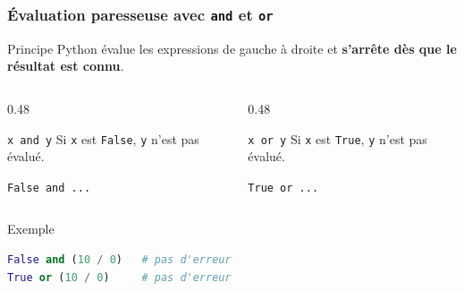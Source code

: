 \documentclass[10pt]{beamer}
\begin{document}
\begin{frame}[containsverbatim]
	\frametitle{Évaluation paresseuse avec \texttt{and} et \texttt{or}}

	\begin{block}{Principe}
		Python évalue les expressions de gauche à droite et
		\textbf{s'arrête dès que le résultat est connu}.
	\end{block}
	
	\vspace{0.2cm}
	
	\begin{columns}[T]
		\begin{column}{0.48\textwidth}
			\begin{alertblock}{\texttt{x and y}}
				Si \texttt{x} est \texttt{False},
				\texttt{y} n'est pas évalué.
				
				\vspace{0.1cm}
				
				\centering
				\texttt{False and ...}
			\end{alertblock}
		\end{column}
		
		\begin{column}{0.48\textwidth}
			\begin{alertblock}{\texttt{x or y}}
				Si \texttt{x} est \texttt{True},
				\texttt{y} n'est pas évalué.
				
				\vspace{0.1cm}
				
				\centering
				\texttt{True or ...}
			\end{alertblock}
		\end{column}
	\end{columns}
	
	\vspace{0.15cm}
	
\begin{exampleblock}{Exemple}
\begin{lstlisting}[language=Python]
False and (10 / 0)   # pas d'erreur
True or (10 / 0)     # pas d'erreur
\end{lstlisting}
\end{exampleblock}
	
\end{frame}
\end{document}
